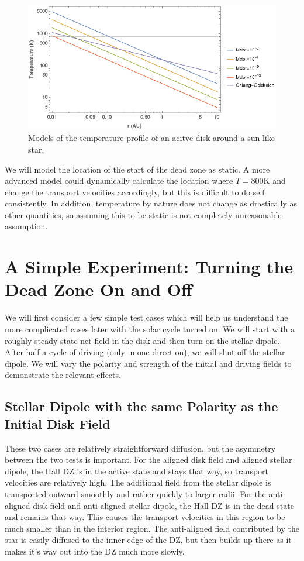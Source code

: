 \begin{figure}[p]
\centering
\includegraphics[width=0.8\columnwidth]{figs/figsChapter3/TemperatureProfiles.png}
\caption{Models of the temperature profile of an acitve disk around a sun-like star.}
\label{fiStExample}
\end{figure}

We will model the location of the start of the dead zone as static.  A more advanced model could dynamically calculate the location where $T=800$K and change the transport velocities accordingly, but this is difficult to do self consistently.  In addition, temperature by nature does not change as drastically as other quantities, so assuming this to be static is not completely unreasonable assumption.




\newpage
\section{A Simple Experiment: Turning the Dead Zone On and Off}
We will first consider a few simple test cases which will help us understand the more complicated cases later with the solar cycle turned on.  We will start with a roughly steady state net-field in the disk and then turn on the stellar dipole.  After half a cycle of driving (only in one direction), we will shut off the stellar dipole.  We will vary the polarity and strength of the initial and driving fields to demonstrate the relevant effects. 


\subsection{Stellar Dipole with the same Polarity as the Initial Disk Field}
These two cases are relatively straightforward diffusion, but the asymmetry between the two tests is important.  For the aligned disk field and aligned stellar dipole, the Hall DZ is in the active state and stays that way, so transport velocities are relatively high.  The additional field from the stellar dipole is transported outward smoothly and rather quickly to larger radii.  For the anti-aligned disk field and anti-aligned stellar dipole, the Hall DZ is in the dead state and remains that way.  This causes the transport velocities in this region to be much smaller than in the interior region.  The anti-aligned field contributed by the star is easily diffused to the inner edge of the DZ, but then builds up there as it makes it's way out into the DZ much more slowly.

